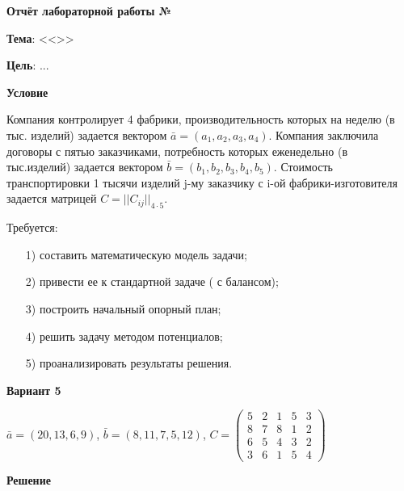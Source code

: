 \begin{center}
  \textbf{Отчёт лабораторной работы №\envReportLabNumber}
\end{center}

\textbf{Тема}:
<<\envReportTitle>>

\textbf{Цель}: ...


\begin{center}
  \textbf{Условие}
\end{center}

Компания контролирует 4 фабрики, производительность которых на неделю (в тыс. изделий) задается вектором $\bar{a} = (a_1, a_2 , a_3 , a_4 )$.
Компания заключила договоры с пятью заказчиками, потребность которых еженедельно (в тыс.изделий) задается вектором $\bar{b} = (b_1 , b_2 , b_3 , b_4 , b_5)$.
Стоимость транспортировки 1 тысячи изделий j-му заказчику  с i-ой фабрики-изготовителя задается матрицей $C = ||C_{ij}||_{4 \cdot 5}$.

Требуется:

\begin{enumerate}
  \item[1)] составить математическую модель задачи;
  \item[2)] привести ее к стандартной задаче ( с балансом);
  \item[3)] построить начальный опорный план;
  \item[4)] решить задачу методом потенциалов;
  \item[5)] проанализировать результаты решения.
\end{enumerate}

\begin{center}
  \textbf{Вариант 5}
\end{center}

$\bar{a} = (20,13,6,9)$, $\bar{b} = (8,11,7,5,12)$, $C= \begin{pmatrix}
  5&2&1&5&3\\
  8&7&8&1&2\\
  6&5&4&3&2\\
  3&6&1&5&4
\end{pmatrix}$

\begin{center}
  \textbf{Решение}
\end{center}

